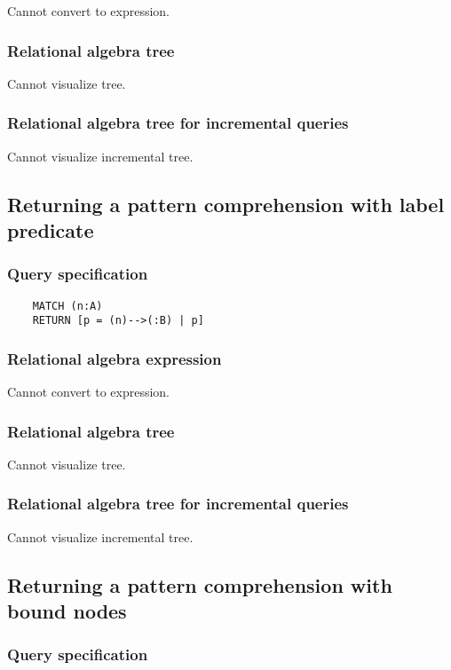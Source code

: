 	Cannot convert to expression.

	\subsubsection*{Relational algebra tree}

	Cannot visualize tree.

	\subsubsection*{Relational algebra tree for incremental queries}

	Cannot visualize incremental tree.
	\subsection{Returning a pattern comprehension with label predicate}

	\subsubsection*{Query specification}

	\begin{lstlisting}
	MATCH (n:A)
	RETURN [p = (n)-->(:B) | p]
	\end{lstlisting}


	\subsubsection*{Relational algebra expression}

	Cannot convert to expression.

	\subsubsection*{Relational algebra tree}

	Cannot visualize tree.

	\subsubsection*{Relational algebra tree for incremental queries}

	Cannot visualize incremental tree.
	\subsection{Returning a pattern comprehension with bound nodes}

	\subsubsection*{Query specification}


